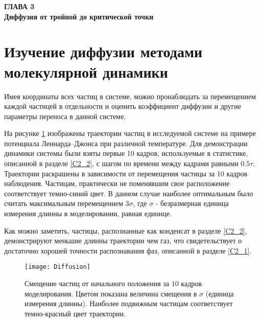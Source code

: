 
\newpage
\begin{center}
\textbf{\large ГЛАВА 3 \\ Диффузия от тройной до критической точки}
\end{center}




\section{Изучение диффузии методами молекулярной динамики}\label{C3_1}

Имея координаты всех частиц в системе, можно пронаблюдать за перемещением каждой частицей в отдельности и оценить коэффициент диффузии и другие параметры переноса в данной системе.

На рисунке \ref{risTreck} изображены траектории частиц в исследуемой системе на примере потенциала Леннарда--Джонса при различной температуре.  Для демонстрации динамики системы были взяты первые 10 кадров, используемые в статистике, описанной в разделе \ref{C2_2}, с шагом по времени между кадрами равными $0.5\tau$. Траектории раскрашены в зависимости от перемещения частицы за 10 кадров наблюдения. Частицам, практически не поменявшим свое расположение соответствует темно-синий цвет. В данном случае наиболее оптимальным было считать максимальным перемещением $3\sigma$, где $\sigma$ - безразмерная единица измерения длинны в моделировании, равная единице.

Как можно заметить, частицы, распознанные как конденсат в разделе \ref{C2_2}, демонстрируют меньшие длинны траектории чем газ, что свидетельствует о достаточно хорошей точности распознавания фаз, описанной в разделе \ref{C2_1}. 

\begin{figure}[h]
\begin{center}
\texttt{[image: Diffusion]}
\caption{Смещение частиц от начального положения за 10 кадров моделирования. Цветом показана величина смещения в $\sigma$ (единица измерения длинны). Наиболее подвижным частицам соответствует темно-красный цвет траектории.}
\label{risTreck}
\end{center}
\end{figure}

